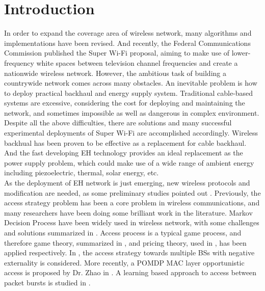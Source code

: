 \documentclass[conference]{IEEEtran}
\begin{document}
\section{Introduction}
In order to expand the coverage area of wireless network,
many algorithms and implementations have been revised.
And recently, the Federal Communications Commission published the Super Wi-Fi proposal,
aiming to make use of lower-frequency white spaces between television channel frequencies
and create a nationwide wireless network.
However, the ambitious task of building a countrywide network comes across many obstacles.
An inevitable problem is how to deploy practical backhaul and energy supply system.
Traditional cable-based systems are excessive, considering the cost for deploying and maintaining the network,
and sometimes impossible as well as dangerous in complex environment.
Despite all the above difficulties, there are solutions and
many successful experimental deployments of Super Wi-Fi are accomplished accordingly.
Wireless backhual has been proven to be effective \cite{30} as a replacement for cable backhaul.
And the fast developing EH technology provides an ideal replacement as the power supply problem, 
which could make use of a wide range of ambient energy including piezoelectric, thermal, solar energy, etc.\\
\indent As the deployment of EH network is just emerging,
new wireless protocols and modification are needed, as some preliminary studies pointed out \cite{27}.
Previously, the access strategy problem has been a core problem in wireless communications,
and many researchers have been doing some brilliant work in the literature.
Markov Decision Process have been widely used in wireless network,
with some challenges and solutions summarized in \cite{23}.
Access process is a typical game process,
and therefore game theory, summarized in \cite{22},
and pricing theory, used in \cite{7}, has been applied respectively.
In \cite{5}, the access strategy towards multiple BSs with negative externality is considered.
More recently, a POMDP MAC layer opportunistic access is proposed by Dr. Zhao in \cite{zhao1}.
A learning based approach to access between packet bursts is studied in \cite{kae1}.
\\
\end{document}
